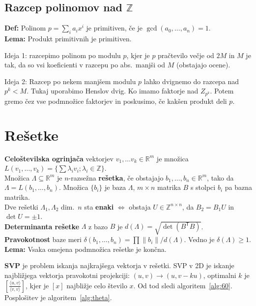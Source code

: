 \documentclass[a4paper,oneside,10pt]{article}
\theoremstyle{definition}
\newcommand{\R}{\ensuremath{\mathbb{R}}}
\newcommand{\Z}{\ensuremath{\mathbb{Z}}}
\newcommand{\T}{\ensuremath{\mathsf{T}}}
\let\oldtextbf\textbf
\renewcommand{\textbf}[1]{\oldtextbf{\boldmath #1}}
\begin{document}
\subsection*{Razcep polinomov nad $\Z$}
\textbf{Def:} Polinom $p = \sum_i a_i x^i$ je primitiven, če je $\gcd(a_0, \ldots, a_n) = 1$. \\
\textbf{Lema:} Produkt primitivnih je primitiven.

Ideja 1: razcepimo polinom po modulu $p$, kjer je $p$ pračtevilo večje od $2M$ in $M$ je tak, da so vsi koeficienti v razcepu po abs.\ manjši od $M$ (obstajajo ocene).

Ideja 2: Razcep po nekem manjšem modulu $p$ lahko dvignemo do razcepa
nad $p^k < M$. Tukaj uporabimo Henslov dvig.
Ko imamo faktorje nad $Z_{p^k}$. Potem gremo čez vse podmnožice faktorjev in poskusimo, če kakšen produkt deli $p$.

\section*{Rešetke}
\textbf{Celoštevilska ogrinjača} vektorjev $v_1, \ldots v_k \in \R^m$ je množica $L(v_1, \ldots, v_k) = \{ \sum \lambda_i v_i; \lambda_i \in \Z \}$. \\
Množica $\Lambda \subseteq \R^m$ je $n$-razsežna \textbf{rešetka}, če obstajajo $b_1, \ldots, b_n \in \R^m$, tako da $\Lambda = L(b_1, \ldots, b_n)$.
Množica $\{b_i\}$ je baza $\Lambda$, $m\times n$ matrika $B$ s stolpci $b_i$ pa bazna matrika.  \\
Dve rešetki $\Lambda_1, \Lambda_2$ dim.\ $n$ sta \textbf{enaki} $\iff$ obstaja $U \in \Z^{n\times n}$, da $B_2 = B_1 U$ in $\det U = \pm 1$.\\
\textbf{Determinanta rešetke} $\Lambda$ z bazo $B$ je $d(\Lambda) = \sqrt{\det(B^\T B)}$.\\
\textbf{Pravokotnost} baze meri $\delta(b_1, \ldots, b_n) = \prod \|b_i\| / d(\Lambda)$. Vedno je $\delta(\Lambda) \geq 1$. \\
\textbf{Lema: } Vsaka omejena podmnožica rešetke je končna.

\textbf{SVP} je problem iskanja najkrajšega vektorja v rešetki.
SVP v 2D je iskanje najbližjega vektorja pravokotni projekciji:
$(u, v) \to (u, v-ku)$, optimalni $k$ je $\left[ \frac{\langle u, v \rangle}{\langle v, v \rangle} \right]$, kjer je $[x]$ najbližje celo število $x$. Od tod sledi algoritem~\ref{alg:60}. Posplošitev je algoritem~\ref{alg:theta}.
\end{document}
